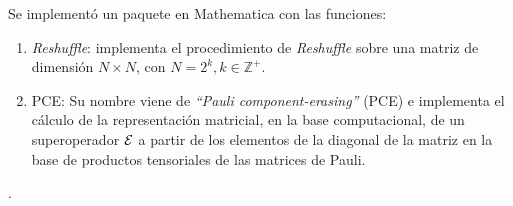 Se implementó un paquete en Mathematica con las funciones:
\begin{enumerate}
\item \textit{Reshuffle}: implementa el procedimiento de 
\textit{Reshuffle} sobre una matriz de dimensión $N\times N$,
con $N=2^k, k\in \mathbb{Z}^+$.

\item PCE: Su nombre viene de \textit{``Pauli component-erasing''}
(PCE) e implementa el cálculo de la representación matricial, en la 
base computacional, de
un superoperador $\mathcal{E}$ a partir de los elementos de la diagonal
de la matriz en la base de productos tensoriales de las matrices 
de Pauli.
\end{enumerate}.




